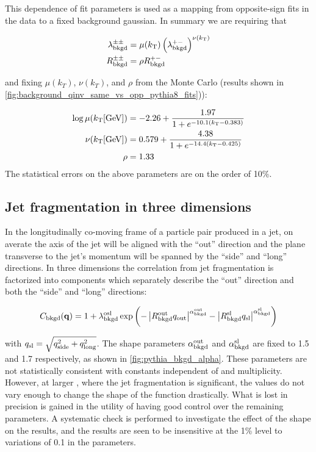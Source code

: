 This \kt dependence of fit parameters is used as a mapping from opposite-sign fits in the data to a fixed background gaussian.
In summary we are requiring that

\begin{align}
\lambda_{\mathrm{bkgd}}^{\pm\pm} &= \mu(k_\mathrm{T}) \left(\lambda_{\mathrm{bkgd}}^{+-}\right)^{\nu(k_\mathrm{T})} \label{eq:lambdaBackPar}\\
R_{\mathrm{bkgd}}^{\pm\pm} &= \rho R_{\mathrm{bkgd}}^{+-} \label{eq:rBackPar}
\end{align}

and fixing $\mu(k_T)$, $\nu(k_T)$, and $\rho$ from the Monte Carlo (results shown in \cref{fig:background_qinv_same_vs_opp_pythia8_fits})):

\begin{align}
\log \mu (\kt [\textrm{GeV}]) &= -2.26 + \frac{1.97}{1 + e^{-10.1 (\kt - 0.383)}} \label{eq:mu}\\
\nu(\kt [\textrm{GeV}]) &= 0.579 + \frac{4.38}{1 + e^{-14.4 (\kt - 0.425)}} \label{eq:nu}\\
\rho &= 1.33 \label{eq:rho} %
\end{align}
The statistical errors on the above parameters are on the order of 10\%.


\subsection{Jet fragmentation in three dimensions}
\label{subsec:jet_frag_3d}

In the longitudinally co-moving frame of a particle pair produced in a jet, on averate the axis of the jet will be aligned with the ``out'' direction and the plane transverse to the jet's momentum will be spanned by the ``side'' and ``long'' directions. In three dimensions the correlation from jet fragmentation is factorized into components which separately describe the ``out'' direction and both the ``side'' and ``long'' directions:

\begin{align}
C_{\mathrm{bkgd}}(\mathbf{q}) = 1 + \lambda_{\mathrm{bkgd}}^\mathrm{osl} \exp\left(-\left| R_\mathrm{bkgd}^\mathrm{out} q_{\mathrm{out}} \right|^{\alpha_{\mathrm{bkgd}}^\mathrm{out}} - \left| R_\mathrm{bkgd}^\mathrm{sl} q_{\mathrm{sl}} \right|^{\alpha_{\mathrm{bkgd}}^\mathrm{sl}}\right) \label{eq:jet_frag_form_3d}
\end{align}

with $q_{\mathrm{sl}} = \sqrt{q_{\mathrm{side}}^2 + q_{\mathrm{long}}^2}$.
The shape parameters $\alpha_{\mathrm{bkgd}}^\mathrm{out}$ and $\alpha_{\mathrm{bkgd}}^\mathrm{sl}$ are fixed to 1.5 and 1.7 respectively, as shown in \cref{fig:pythia_bkgd_alpha}.
These parameters are not statistically consistent with constants independent of \kt and multiplicity.
However, at larger \kt, where the jet fragmentation is significant, the values do not vary enough to change the shape of the function drastically.
What is lost in precision is gained in the utility of having good control over the remaining parameters.
A systematic check is performed to investigate the effect of the shape on the results, and the results are seen to be insensitive at the 1\% level to variations of 0.1 in the \abkgd parameters.


